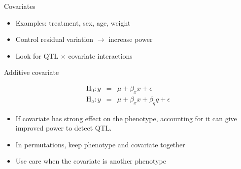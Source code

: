 \documentclass[12pt]{article}
\newcommand{\headsize}{\fontsize{35}{35} \selectfont}
\newcommand{\smallsize}{\fontsize{25}{30} \selectfont}
\begin{document}
\newpage

\headsize \color{myyellow}
\hfill \begin{minipage}{5.75in}
\centering
Covariates
\end{minipage}

\smallsize \color{mywhite}

\vspace{25mm}

\hfill
\begin{minipage}{10in}
\begin{itemize}
\setlength{\itemsep}{24pt}
\item {\color{mypink} Examples}: treatment, sex, age, weight

\item Control residual variation {\color{mypink} $\rightarrow$}
  increase power

\item Look for QTL $\times$ covariate interactions
\end{itemize}
\end{minipage}

\newpage

\headsize \color{myyellow}
\hfill \begin{minipage}{5.75in}
\centering
Additive covariate
\end{minipage}

\vspace{15mm}

\color{mywhite} \smallsize

\begin{eqnarray*}
\text{H}_0: y & = & \mu + \beta_x x + \epsilon \\
\text{H}_a: y & = & \mu + \beta_x x + \beta_q q + \epsilon
\end{eqnarray*}

\vspace{30mm}

\hspace{0.5in}
\begin{minipage}{9.5in}
\begin{itemize}
\itemsep20pt
\item If covariate has strong effect on the phenotype, accounting for
  it can give improved power to detect QTL.
\item In permutations, keep phenotype and covariate together
\item Use care when the covariate is another phenotype
\end{itemize}
\end{minipage}
\end{document}

